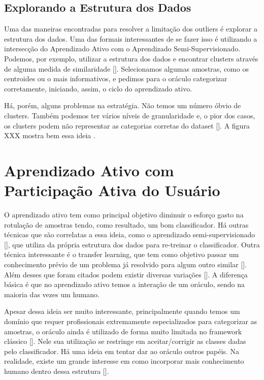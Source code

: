  \subsection{Explorando a Estrutura dos Dados} 
\label{sec:explorando_estrutura_dados }

Uma das maneiras encontradas para resolver a limitação dos outliers é explorar a estrutura dos dados. Uma das formais interessantes de se fazer isso é utilizando a intersecção do Aprendizado Ativo com o Aprendizado Semi-Supervisionado. Podemos, por exemplo, utilizar a estrutura dos dados e encontrar clusters através de alguma medida de similaridade [\cite{saito2014active, dasgupta2011two}]. Selecionamos algumas amostras, como os centroides ou o mais informativos, e pedimos para o oráculo categorizar corretamente, iniciando, assim, o ciclo do aprendizado ativo. 

Há, porém, alguns problemas na estratégia. Não temos um número óbvio de clusters. Também podemos ter vários níveis de granularidade e, o pior dos casos, os clusters podem não representar as categorias corretas do dataset [\cite{dasgupta2011two, settles2014active}].  A figura XXX mostra bem essa ideia .

\section{Aprendizado Ativo com Participação Ativa do Usuário}
\label{sec:aprendizado_ativo_variacoes}

O aprendizado ativo tem como principal objetivo diminuir o esforço gasto na rotulação de amostras tendo, como resultado, um bom classificador. Há outras técnicas que são correlatas a essa ideia, como o aprendizado semi-supervisionado [\cite{zhu2006semi}], que utiliza da própria estrutura dos dados para re-treinar o classificador. Outra técnica interessante é o transfer learning, que tem como objetivo passar um conhecimento prévio de um problema já resolvido para algum outro similar []. Além desses que foram citados podem existir diversas variações []. A diferença básica é que no aprendizado ativo temos a interação de um oráculo, sendo na maioria das vezes um humano. 


Apesar dessa ideia ser muito interessante, principalmente quando temos um domínio que requer profissionais extremamente especializados para categorizar as amostras, o oráculo ainda é utilizado de forma muito limitada no framework clássico [\cite{seifert2010user}]. Nele sua utilização se restringe em aceitar/corrigir as classes dadas pelo classificador. Há uma ideia em tentar dar ao oráculo outros papéis. Na realidade, existe um grande interesse em como incorporar mais conhecimento humano dentro dessa estrutura [\cite{settles2014active}]. 

